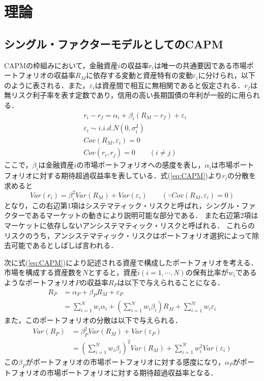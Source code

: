 \documentclass[11pt]{jreport}
\begin{document}
\chapter{理論}
\section{シングル・ファクターモデルとしてのCAPM}
CAPMの枠組みにおいて，金融資産$i$の収益率$r_i$は唯一の共通要因である市場ポートフォリオの収益率$R_M$に依存する変動と資産特有の変動$\varepsilon_i$に分けられ，以下のように表される．また，$\varepsilon_i$は資産間で相互に無相関であると仮定される．$r_f$は無リスク利子率を表す定数であり，信用の高い長期国債の年利が一般的に用られる．
\begin{equation}
\begin{split}
&r_i - r_f = \alpha_i + \beta_i(R_M - r_f) + \varepsilon_i\\
&\varepsilon_i \sim i.i.d.N(0,\sigma_i^2)\\
&Cov(R_M, \varepsilon_i) = 0\\
&Cov(r_i, r_j) = 0 \qquad (i \neq j)
\label{eq:CAPM}
\end{split}
\end{equation}
ここで，$\beta_i$は金融資産$i$の市場ポートフォリオへの感度を表し，$\alpha_i$は市場ポートフォリオに対する期待超過収益率を表している．式(\ref{eq:CAPM})より$r_i$の分散を求めると
\begin{equation}
Var(r_i) = \beta_i^2Var(R_M) + Var(\varepsilon_i) \qquad (\text{∵}Cov(R_M, \varepsilon_i) = 0)
\label{eq:CAPM_var}
\end{equation}
となり，この右辺第1項はシステマティック・リスクと呼ばれ，シングル・ファクターであるマーケットの動きにより説明可能な部分である．
また右辺第2項はマーケットに依存しないアンシステマティック・リスクと呼ばれる．
これらのリスクのうち，アンシステマティック・リスクはポートフォリオ選択によって除去可能であるとしばしば言われる．

次に式(\ref{eq:CAPM})により記述される資産で構成したポートフォリオを考える．市場を構成する資産数を$N$とすると，資産$i(i=1,\cdots,N)$の保有比率が$w_i$であるようなポートフォリオ$P$の収益率$R_P$は以下で与えられることになる．
\begin{equation}
\begin{split}
R_P &= \alpha_P + \beta_PR_M + \varepsilon_P\\
&= \sum_{i=1}^N w_i\alpha_i
+\left(\sum_{i=1}^N w_i\beta_i\right)R_M
+\sum_{i=1}^N w_i\varepsilon_i
\end{split}
\end{equation}
また，このポートフォリオの分散は以下で与えられる．
\begin{equation}
\begin{split}
Var(R_P) &= \beta_P^2 Var(R_M) + Var(\varepsilon_P)\\
& = \left(\sum_{i=1}^N w_i\beta_i\right)^2Var(R_M) + \sum_{i=1}^N w_i^2 Var(\varepsilon_i)
\end{split}
\end{equation}
この$\beta_P$がポートフォリオの市場ポートフォリオに対する感度になり，$\alpha_P$がポートフォリオの市場ポートフォリオに対する期待超過収益率となる．
\end{document}
